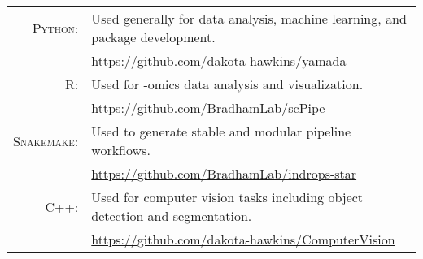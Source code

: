 \documentclass[a4paper,10pt]{article}
\begin{document}
\section{\color{linkcolour}{Programming Languages}}
\begin{tabular}{rl}
	\textsc{Python:}& Used generally for data analysis, machine learning, and package development.\\
		& \small{\href{https://github.com/dakota-hawkins/yamada}{https://github.com/dakota-hawkins/yamada}}\\
	\textsc{R:}& Used for -omics data analysis and visualization.\\
		& \small{\href{https://github.com/BradhamLab/scPipe}{https://github.com/BradhamLab/scPipe}} \\
	\textsc{Snakemake:} & Used to generate stable and modular pipeline workflows. \\
		&\small{\href{https://github.com/BradhamLab/indrops-star}{https://github.com/BradhamLab/indrops-star}} \\
	\textsc{C++:} & Used for computer vision tasks including object detection and segmentation.\\
		& \small{\href{https://github.com/dakota-hawkins/ComputerVision}{https://github.com/dakota-hawkins/ComputerVision}} \\
\end{tabular}
\end{document}
